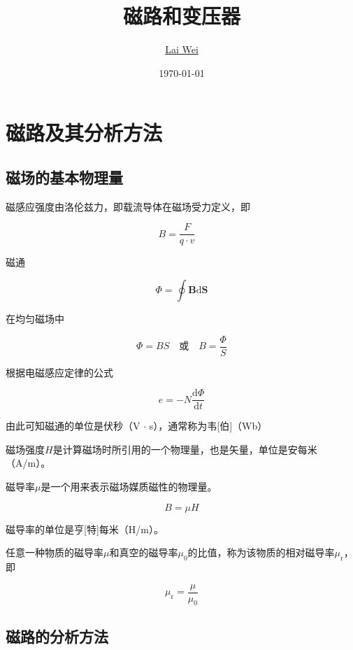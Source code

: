 \documentclass[12pt]{article}
\title{磁路和变压器}
\author{\href{mailto:lai-wei@whu.edu.cn}{Lai Wei}}
\date{\today}
\newcommand{\rmd}{\mathrm{d}}
\newcommand{\deriv}[2]{\frac{\rmd #1}{\rmd #2}}
\begin{document}
\maketitle

\section{磁路及其分析方法}

\subsection{磁场的基本物理量}

磁感应强度由洛伦兹力，即载流导体在磁场受力定义，即

\begin{equation}
    B = \frac{F}{q \cdot v} \quad
\end{equation}

磁通

\begin{equation}
    \Phi = \oint \mathbf{B} \rmd \mathbf{S}
\end{equation}

在均匀磁场中

\begin{equation}
    \Phi = BS \quad \text{或} \quad B = \frac{\Phi}{S}
\end{equation}

根据电磁感应定律的公式

\begin{equation}
    e = -N \deriv{\Phi}{t}
\end{equation}

由此可知磁通的单位是伏秒（V \(\cdot\) s），通常称为韦[伯]（Wb）

磁场强度\(H\)是计算磁场时所引用的一个物理量，也是矢量，单位是安每米（A/m）。

磁导率\(\mu\)是一个用来表示磁场媒质磁性的物理量。

\begin{equation}
    B = \mu H
\end{equation}

磁导率的单位是亨[特]每米（H/m）。

任意一种物质的磁导率\(\mu\)和真空的磁导率\(\mu_0\)的比值，称为该物质的相对磁导率\(\mu_{\text{r}}\)，即

\begin{equation}
    \mu_{\text{r}} = \frac{\mu}{\mu_0}
\end{equation}

\subsection{磁路的分析方法}
\end{document}
